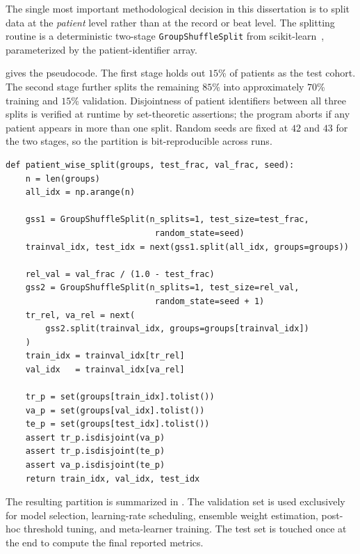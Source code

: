 The single most important methodological decision in this dissertation is to split data at the \textit{patient} level rather than at the record or beat level. The splitting routine is a deterministic two-stage \texttt{GroupShuffleSplit} from scikit-learn~\cite{pedregosa2011scikit}, parameterized by the patient-identifier array.

 gives the pseudocode. The first stage holds out $15$\% of patients as the test cohort. The second stage further splits the remaining $85$\% into approximately $70$\% training and $15$\% validation. Disjointness of patient identifiers between all three splits is verified at runtime by set-theoretic assertions; the program aborts if any patient appears in more than one split. Random seeds are fixed at $42$ and $43$ for the two stages, so the partition is bit-reproducible across runs.

\begin{lstlisting}[caption={Patient-wise splitting routine (from \texttt{approaches/mi\_detection\_prod/data.py}).}, label={lst:split}]
def patient_wise_split(groups, test_frac, val_frac, seed):
    n = len(groups)
    all_idx = np.arange(n)

    gss1 = GroupShuffleSplit(n_splits=1, test_size=test_frac,
                              random_state=seed)
    trainval_idx, test_idx = next(gss1.split(all_idx, groups=groups))

    rel_val = val_frac / (1.0 - test_frac)
    gss2 = GroupShuffleSplit(n_splits=1, test_size=rel_val,
                              random_state=seed + 1)
    tr_rel, va_rel = next(
        gss2.split(trainval_idx, groups=groups[trainval_idx])
    )
    train_idx = trainval_idx[tr_rel]
    val_idx   = trainval_idx[va_rel]

    tr_p = set(groups[train_idx].tolist())
    va_p = set(groups[val_idx].tolist())
    te_p = set(groups[test_idx].tolist())
    assert tr_p.isdisjoint(va_p)
    assert tr_p.isdisjoint(te_p)
    assert va_p.isdisjoint(te_p)
    return train_idx, val_idx, test_idx
\end{lstlisting}

The resulting partition is summarized in . The validation set is used exclusively for model selection, learning-rate scheduling, ensemble weight estimation, post-hoc threshold tuning, and meta-learner training. The test set is touched once at the end to compute the final reported metrics.

